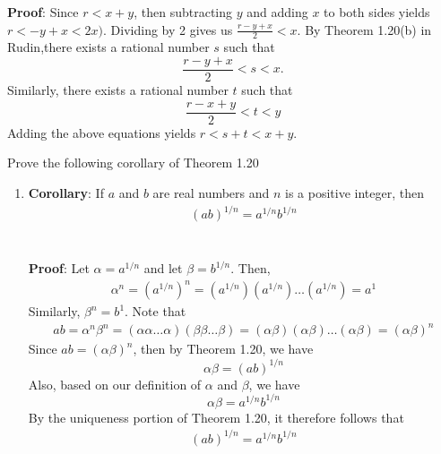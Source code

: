 \documentclass[12pt]{article}
\begin{document}
\begin{enumerate}
\textbf{Proof}: Since $r<x+y$, then subtracting $y$ and adding $x$ to both sides yields $r<-y+x<2x)$. Dividing by 2 gives us $\frac{r-y+x}{2} < x$. By Theorem 1.20(b) in Rudin,there exists a rational number $s$ such that \begin{equation*} 
\frac{r-y+x}{2} <s < x. 
\end{equation*} Similarly, there exists a rational number $t$ such that 
\begin{equation*} 
\frac{r-x+y}{2} < t < y 
\end{equation*}
Adding the above equations yields $r<s+t<x+y$.
\end{enumerate}
\problem Prove the following corollary of Theorem 1.20
\begin{enumerate}
\item \textbf{Corollary}: If $a$ and $b$ are real numbers and $n$ is a positive integer, then 
\begin{align*}
(ab)^{1/n}	= a^{1/n}b^{1/n}
\end{align*} \\ \\
\textbf{Proof}: Let $\alpha = a^{1/n}$ and let $\beta = b^{1/n}$. Then,
\begin{align*}
\alpha^{n} = (a^{1/n})^{n} = (a^{1/n})(a^{1/n}) \ldots (a^{1/n}) = a^{1}
\end{align*}
Similarly, $\beta^{n} = b^{1}$. Note that \begin{align*}
ab = \alpha^{n} \beta^{n} = (\alpha \alpha \dots \alpha)(\beta \beta \ldots \beta) = (\alpha \beta)(\alpha \beta) \ldots (\alpha \beta) = (\alpha \beta)^{n}
\end{align*}
Since $ab=(\alpha \beta)^{n}$, then by Theorem 1.20, we have \begin{equation}
\alpha \beta = (ab)^{1/n}
\end{equation} 
Also, based on our definition of $\alpha$ and $\beta$, we have 
\begin{equation}
\alpha \beta = a^{1/n}b^{1/n}
\end{equation} 
By the uniqueness portion of Theorem 1.20, it therefore follows that 
\begin{align*}
(ab)^{1/n}	= a^{1/n}b^{1/n}
\end{align*} 
\end{enumerate}
\end{document}

